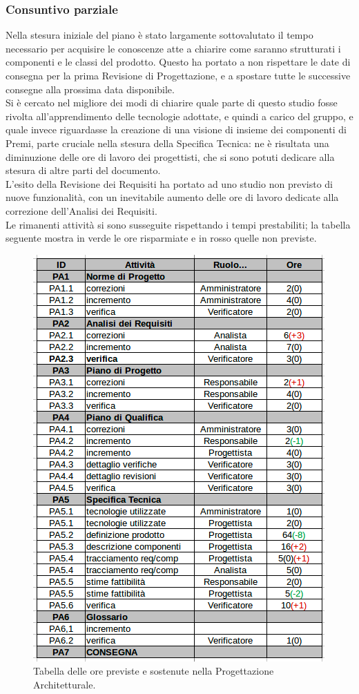 \subsubsection{Consuntivo parziale}
Nella stesura iniziale del piano è stato largamente sottovalutato il tempo necessario per acquisire le conoscenze atte a chiarire come saranno strutturati i componenti e le classi del prodotto. Questo ha portato a non rispettare le date di consegna per la prima Revisione di Progettazione, e a spostare tutte le successive consegne alla prossima data disponibile. \\
Si è cercato nel migliore dei modi di chiarire quale parte di questo studio fosse rivolta all'apprendimento delle tecnologie adottate, e quindi a carico del gruppo, e quale invece riguardasse la creazione di una visione di insieme dei componenti di Premi, parte cruciale nella stesura della Specifica Tecnica: ne è risultata una diminuzione delle ore di lavoro dei progettisti, che si sono potuti dedicare alla stesura di altre parti del documento. \\
L'esito della Revisione dei Requisiti ha portato ad uno studio non previsto di nuove funzionalità, con un inevitabile aumento delle ore di lavoro dedicate alla correzione dell'Analisi dei Requisiti. \\
Le rimanenti attività si sono susseguite rispettando i tempi prestabiliti; la tabella seguente mostra in verde le ore risparmiate e in rosso quelle non previste. \\

\begin{figure}[H]
\begin{center}
\includegraphics[scale=0.65]{img/consuntivo-progarc.png}
\caption{Tabella delle ore previste e sostenute nella Progettazione Architetturale.}
\end{center}
\end{figure}

